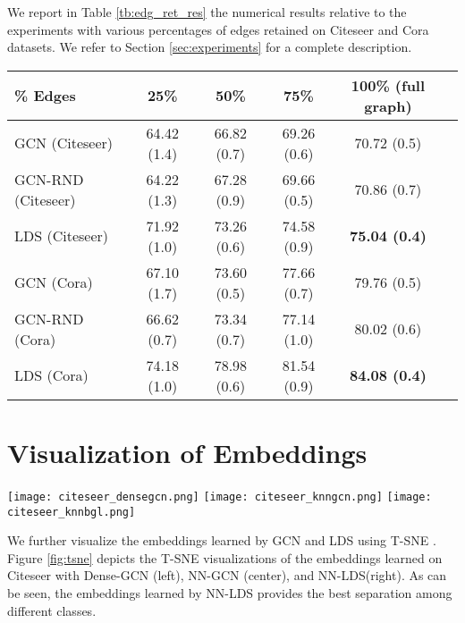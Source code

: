 \documentclass{article}
\newcommand{\lds}{\textsc{LDS}\xspace}
\begin{document}
We report in Table \ref{tb:edg_ret_res} the numerical results relative to the experiments with various percentages of edges retained on Citeseer and Cora datasets. We refer to Section \ref{sec:experiments} for a complete description.
\begin{table*}[t]
    \centering
    \caption{Test accuracy ( standard deviation) in percentage for the experiments on Citeseer and Cora, with various percentages of edges retained (see Figure \ref{fig:edgrem}). The data split is the same used in  \citep{kipf2016semi}}
    \vspace{2mm}
    \begin{tabular}{lccccc}
\toprule
\% Edges    & 25\%   & 50\%   & 75\%   & 100\% (full graph) \\
\midrule
GCN (Citeseer) & 64.42 (1.4) & 66.82 (0.7) & 69.26 (0.6) & 70.72 (0.5) \\
GCN-RND (Citeseer) & 64.22 (1.3) & 67.28 (0.9) & 69.66 (0.5) & 70.86 (0.7) \\
LDS (Citeseer) & 71.92 (1.0) & 73.26 (0.6) & 74.58 (0.9) & \textbf{75.04 (0.4)} \\
\midrule
GCN (Cora) & 67.10 (1.7) & 73.60 (0.5) & 77.66 (0.7) & 79.76 (0.5) \\
GCN-RND (Cora) & 66.62 (0.7) & 73.34 (0.7) & 77.14 (1.0) & 80.02 (0.6) \\
LDS (Cora) & 74.18 (1.0) & 78.98 (0.6) & 81.54 (0.9) & \textbf{84.08 (0.4)} 
\\
\bottomrule
\end{tabular}
    \label{tb:edg_ret_res}
\end{table*}

\section{Visualization of Embeddings}

\begin{figure*}[t]
    \centering
    \texttt{[image: citeseer\_densegcn.png]}
    \hspace{-2mm}
    \texttt{[image: citeseer\_knngcn.png]}
    \hspace{-2mm}
    \texttt{[image: citeseer\_knnbgl.png]}
    \caption{T-SNE visualization of the output activations (before the classification layer) on the Citeseer dataset. Left: Dense-GCN, Center: NN-GCN, Right NN-\lds}
    \label{fig:tsne}
\end{figure*}

We further visualize the embeddings learned by GCN and \lds using T-SNE \citep{maaten2008visualizing}. Figure \ref{fig:tsne} depicts the T-SNE visualizations of the embeddings learned on Citeseer with Dense-GCN (left), NN-GCN (center), and NN-\lds (right). As can be seen, the embeddings learned by NN-\lds provides the best separation among different classes. 
\end{document}
